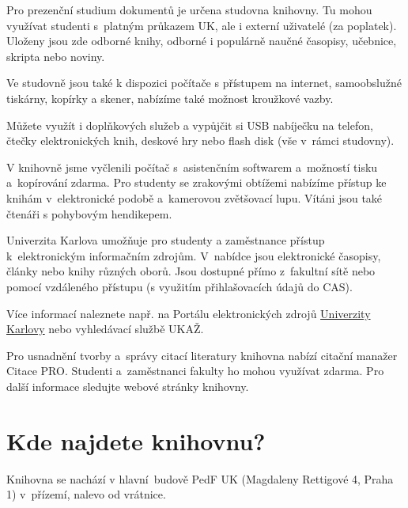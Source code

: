 Pro prezenční studium dokumentů je určena studovna knihovny. Tu mohou
využívat studenti s~platným průkazem UK, ale i externí uživatelé (za
poplatek). Uloženy jsou zde odborné knihy, odborné i populárně naučné
časopisy, učebnice, skripta nebo noviny.

Ve studovně jsou také k dispozici počítače s přístupem na internet,
samoobslužné tiskárny, kopírky a skener, nabízíme také možnost kroužkové
vazby.

Můžete využít i doplňkových služeb a vypůjčit si USB nabíječku na
telefon, čtečky elektronických knih, deskové hry nebo flash disk (vše
v~rámci studovny).



V knihovně jsme vyčlenili počítač s~asistenčním softwarem
a~možností tisku a~kopírování zdarma. Pro studenty se zrakovými obtížemi
nabízíme přístup ke knihám v~elektronické podobě a~kamerovou
zvětšovací lupu. 
Vítáni jsou také čtenáři s pohybovým hendikepem.  


Univerzita Karlova umožňuje pro studenty a zaměstnance přístup
k~elektronickým informačním zdrojům. V~nabídce jsou elektronické
časopisy, články nebo knihy různých oborů. Jsou dostupné přímo
z~fakultní sítě nebo pomocí vzdáleného přístupu (s využitím
přihlašovacích údajů do CAS).

Více informací naleznete např. na Portálu elektronických zdrojů
{\href{http://pez.cuni.cz}{Univerzity Karlovy}} nebo vyhledávací
službě UKAŽ.


Pro usnadnění tvorby a~správy citací literatury knihovna nabízí citační
manažer Citace PRO. Studenti a~zaměstnanci fakulty ho mohou využívat
zdarma. Pro další informace sledujte webové stránky knihovny.

\section{Kde najdete knihovnu?}

Knihovna se nachází v hlavní~budově PedF UK (Magdaleny Rettigové 4,
Praha 1) v~přízemí, nalevo od vrátnice.

